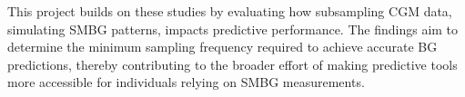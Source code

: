This project builds on these studies by evaluating how subsampling CGM data, simulating SMBG patterns, impacts predictive performance. The findings aim to determine the minimum sampling frequency required to achieve accurate BG predictions, thereby contributing to the broader effort of making predictive tools more accessible for individuals relying on SMBG measurements.





















